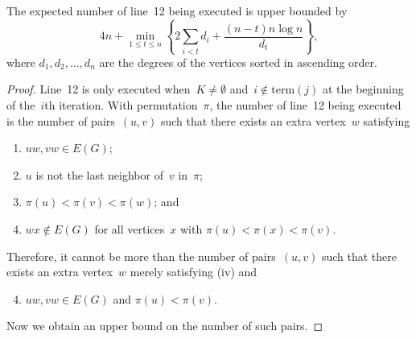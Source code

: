 \documentclass[10pt,a4paper]{amsart}
\begin{document}
\begin{lemma}\label{lem:analysis}
  The expected number of line~12 being executed is upper bounded by
  \[
    4n+ \min_{1\le t\le n}\left\{2\sum_{i< t}d_i+\frac{(n-t)n\log n}{d_{t}}\right\},
  \]
  where $d_1,d_2,\ldots,d_n$ are the degrees of the vertices sorted in ascending order.
\end{lemma}

\begin{proof}
  Line~12 is only executed when~$K\ne \emptyset$ and~$i\not\in \mathrm{term}(j)$ at the beginning of the~$i$th iteration.  With permutation~$\pi$, the number of line~12 being executed is the number of pairs~$(u, v)$ such that there exists an extra vertex~$w$ satisfying
  \begin{enumerate}[label = (\roman*),left=10pt]
    \item $u w, v w\in E(G)$;
    \item $u$ is not the last neighbor of~$v$ in~$\pi$;
    \item $\pi(u) < \pi(v) < \pi(w)$; and
    \item $w x\not\in E(G)$ for all vertices~$x$ with $\pi(u) < \pi(x) < \pi(v)$.
  \end{enumerate}
  Therefore, it cannot be more than the number of pairs~$(u, v)$ such that there exists an extra vertex~$w$ merely satisfying (iv) and
  \begin{enumerate}[label = (\roman*),left=10pt]
    \setcounter{enumi}{3}
    \item $u w, v w\in E(G)$ and $\pi(u) < \pi(v)$.
  \end{enumerate}
  Now we obtain an upper bound on the number of such pairs.


\end{proof}
\end{document}
